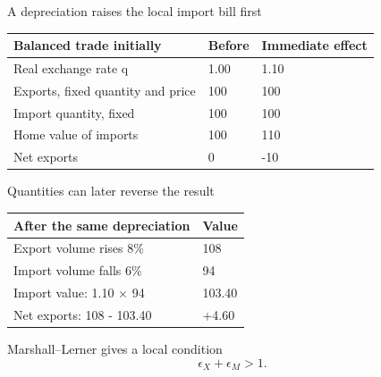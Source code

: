 \documentclass[12pt,aspectratio=169]{beamer}
\begin{document}

\begin{frame}{A depreciation raises the local import bill first}
\begin{center}\begin{tabular}{@{}lll@{}}\toprule \textbf{Balanced trade initially} & \textbf{Before} & \textbf{Immediate effect}\\\midrule Real exchange rate q & 1.00 & 1.10\\[2mm]
Exports, fixed quantity and price & 100 & 100\\[2mm]
Import quantity, fixed & 100 & 100\\[2mm]
Home value of imports & 100 & 110\\[2mm]
Net exports & 0 & -10\\\bottomrule\end{tabular}\end{center}
\end{frame}


\begin{frame}{Quantities can later reverse the result}
\begin{center}\begin{tabular}{@{}ll@{}}\toprule \textbf{After the same depreciation} & \textbf{Value}\\\midrule Export volume rises 8\% & 108\\[2mm]
Import volume falls 6\% & 94\\[2mm]
Import value: 1.10 × 94 & 103.40\\[2mm]
Net exports: 108 - 103.40 & +4.60\\\bottomrule\end{tabular}\end{center}
\end{frame}


\begin{frame}{Marshall–Lerner gives a local condition}
\[\epsilon_X+\epsilon_M>1.\]
\end{frame}
\end{document}
